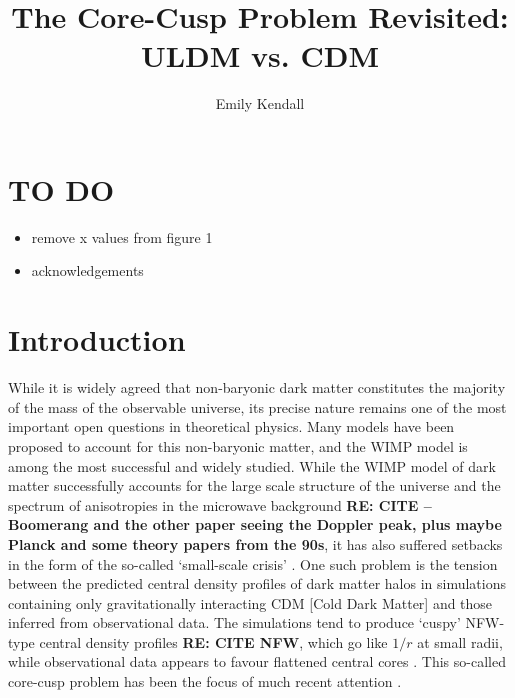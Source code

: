 \documentclass[a4paper,11pt]{article}
\title{\boldmath The Core-Cusp Problem Revisited: ULDM vs. CDM}
\author[1]{Emily Kendall}
\affiliation[1]{Department of Physics, University of Auckland, Private Bag 92019, Auckland, New Zealand}
\newcommand{\re}[1]{{{\bf \color{green} RE: #1}}}
\begin{document}
\maketitle
\flushbottom

\section{TO DO}
\begin{itemize}
    \item remove x values from figure 1 
    \item acknowledgements
\end{itemize}


\section{Introduction}\label{sec:intro}

While it is widely agreed that non-baryonic dark matter constitutes the majority of the mass of the observable universe, its precise nature remains one of the most important open questions in theoretical physics. Many models have been proposed to account for this non-baryonic matter, and the WIMP model is among the most successful and widely studied. While the WIMP model of dark matter successfully accounts for the large scale structure of the universe \cite{Springel:2005nw} and the spectrum of anisotropies in the microwave background \re{CITE -- Boomerang and the other paper seeing the Doppler peak, plus maybe Planck and some theory papers from the 90s}, it has also suffered setbacks in the form of the so-called `small-scale crisis' \cite{Weinberg:2013aya}. One such problem is the tension between the predicted central density profiles of dark matter halos in simulations containing only gravitationally interacting CDM [Cold Dark Matter] and those inferred from observational data. The simulations tend to produce `cuspy' NFW-type central density profiles \re{CITE NFW}, which go like $1/r$ at small radii, while observational data appears to favour flattened central cores \cite{REF} . This so-called core-cusp problem has been the focus of much recent attention \cite{Dutton:2018nop, Read:2018pft, Genina:2018}. 
\end{document}
